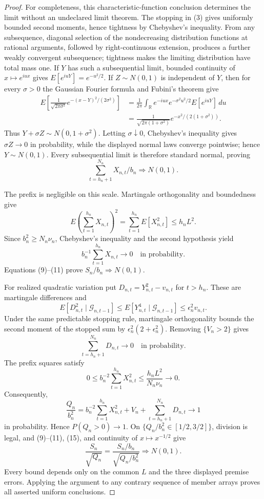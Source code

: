 \documentclass{article}
\begin{document}
\begin{proof}
For completeness, this characteristic-function conclusion determines the limit without an undeclared limit theorem. The stopping in (3) gives uniformly bounded second moments, hence tightness by Chebyshev's inequality. From any subsequence, diagonal selection of the nondecreasing distribution functions at rational arguments, followed by right-continuous extension, produces a further weakly convergent subsequence; tightness makes the limiting distribution have total mass one. If \(Y\) has such a subsequential limit, bounded continuity of \(x\mapsto e^{iux}\) gives \(E[e^{iuY}]=e^{-u^2/2}\). If \(Z\sim N(0,1)\) is independent of \(Y\), then for every \(\sigma>0\) the Gaussian Fourier formula and Fubini's theorem give
\[
\begin{aligned}
 E\!\left[\frac1{\sqrt{2\pi\sigma^2}}
 e^{-(x-Y)^2/(2\sigma^2)}\right]
 &=\frac1{2\pi}\int_{\mathbb R}e^{-iux}
 e^{-\sigma^2u^2/2}E[e^{iuY}]\,du\\
 &=\frac1{\sqrt{2\pi(1+\sigma^2)}}
 e^{-x^2/(2(1+\sigma^2))}.
\end{aligned}
\tag{8}
\]
Thus \(Y+\sigma Z\sim N(0,1+\sigma^2)\). Letting \(\sigma\downarrow0\), Chebyshev's inequality gives \(\sigma Z\to0\) in probability, while the displayed normal laws converge pointwise; hence \(Y\sim N(0,1)\). Every subsequential limit is therefore standard normal, proving
\[
 \sum_{t=h_n+1}^{N_n}X_{n,t}/b_n\Rightarrow N(0,1).
\tag{9}
\]

The prefix is negligible on this scale. Martingale orthogonality and boundedness give
\[
 E\left(\sum_{t=1}^{h_n}X_{n,t}\right)^2
 =\sum_{t=1}^{h_n}E[X_{n,t}^2]\le h_nL^2.
\tag{10}
\]
Since \(b_n^2\ge N_n\nu_n\), Chebyshev's inequality and the second hypothesis yield
\[
 b_n^{-1}\sum_{t=1}^{h_n}X_{n,t}\longrightarrow0
 \quad\text{in probability}.
\tag{11}
\]
Equations (9)--(11) prove \(S_n/b_n\Rightarrow N(0,1)\).

For realized quadratic variation put \(D_{n,t}=Y_{n,t}^2-v_{n,t}\) for \(t>h_n\). These are martingale differences and
\[
 E[D_{n,t}^2\mid\mathcal G_{n,t-1}]
 \le E[Y_{n,t}^4\mid\mathcal G_{n,t-1}]
 \le\epsilon_n^2v_{n,t}.
\tag{12}
\]
Under the same predictable stopping rule, martingale orthogonality bounds the second moment of the stopped sum by \(\epsilon_n^2(2+\epsilon_n^2)\). Removing \(\{V_n>2\}\) gives
\[
 \sum_{t=h_n+1}^{N_n}D_{n,t}\longrightarrow0
 \quad\text{in probability}.
\tag{13}
\]
The prefix squares satisfy
\[
 0\le b_n^{-2}\sum_{t=1}^{h_n}X_{n,t}^2
 \le\frac{h_nL^2}{N_n\nu_n}\longrightarrow0.
\tag{14}
\]
Consequently,
\[
 \frac{Q_n}{b_n^2}
 =b_n^{-2}\sum_{t=1}^{h_n}X_{n,t}^2+V_n
 +\sum_{t=h_n+1}^{N_n}D_{n,t}
 \longrightarrow1
\tag{15}
\]
in probability. Hence \(P(Q_n>0)\to1\). On \(\{Q_n/b_n^2\in[1/2,3/2]\}\), division is legal, and (9)--(11), (15), and continuity of \(x\mapsto x^{-1/2}\) give
\[
 \frac{S_n}{\sqrt{Q_n}}
 =\frac{S_n/b_n}{\sqrt{Q_n/b_n^2}}\Rightarrow N(0,1).
\tag{16}
\]
Every bound depends only on the common \(L\) and the three displayed premise errors. Applying the argument to any contrary sequence of member arrays proves all asserted uniform conclusions.
\end{proof}
\end{document}
